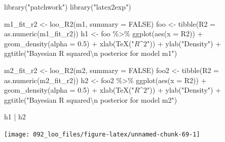\documentclass[
  10pt,
  italian,
  a4paper,
  extrafontsizes,onecolumn,openright
  ]{memoir}
\newenvironment{Shaded}{\begin{snugshade}}{\end{snugshade}}
\newcommand{\AttributeTok}[1]{\textcolor[rgb]{0.77,0.63,0.00}{#1}}
\newcommand{\ConstantTok}[1]{\textcolor[rgb]{0.00,0.00,0.00}{#1}}
\newcommand{\FloatTok}[1]{\textcolor[rgb]{0.00,0.00,0.81}{#1}}
\newcommand{\FunctionTok}[1]{\textcolor[rgb]{0.00,0.00,0.00}{#1}}
\newcommand{\NormalTok}[1]{#1}
\newcommand{\OtherTok}[1]{\textcolor[rgb]{0.56,0.35,0.01}{#1}}
\newcommand{\SpecialCharTok}[1]{\textcolor[rgb]{0.00,0.00,0.00}{#1}}
\newcommand{\StringTok}[1]{\textcolor[rgb]{0.31,0.60,0.02}{#1}}
\theoremstyle{definition}
\theoremstyle{definition}
\theoremstyle{definition}
\theoremstyle{definition}
\theoremstyle{remark}
\begin{document}
\begin{Shaded}
\begin{Highlighting}[]
\FunctionTok{library}\NormalTok{(}\StringTok{"patchwork"}\NormalTok{)}
\FunctionTok{library}\NormalTok{(}\StringTok{"latex2exp"}\NormalTok{)}

\NormalTok{m1\_fit\_r2 }\OtherTok{\textless{}{-}} \FunctionTok{loo\_R2}\NormalTok{(m1, }\AttributeTok{summary =} \ConstantTok{FALSE}\NormalTok{)}
\NormalTok{foo }\OtherTok{\textless{}{-}} \FunctionTok{tibble}\NormalTok{(}\AttributeTok{R2 =} \FunctionTok{as.numeric}\NormalTok{(m1\_fit\_r2))}
\NormalTok{h1 }\OtherTok{\textless{}{-}}\NormalTok{ foo }\SpecialCharTok{\%\textgreater{}\%} 
  \FunctionTok{ggplot}\NormalTok{(}\FunctionTok{aes}\NormalTok{(}\AttributeTok{x =}\NormalTok{ R2)) }\SpecialCharTok{+}
  \FunctionTok{geom\_density}\NormalTok{(}\AttributeTok{alpha =} \FloatTok{0.5}\NormalTok{) }\SpecialCharTok{+}
  \FunctionTok{xlab}\NormalTok{(}\FunctionTok{TeX}\NormalTok{(}\StringTok{"$R\^{}2$"}\NormalTok{)) }\SpecialCharTok{+}
  \FunctionTok{ylab}\NormalTok{(}\StringTok{"Density"}\NormalTok{) }\SpecialCharTok{+}
  \FunctionTok{ggtitle}\NormalTok{(}\StringTok{"Bayesian R squared}\SpecialCharTok{\textbackslash{}n}\StringTok{ posterior for model m1"}\NormalTok{)}

\NormalTok{m2\_fit\_r2 }\OtherTok{\textless{}{-}} \FunctionTok{loo\_R2}\NormalTok{(m2, }\AttributeTok{summary =} \ConstantTok{FALSE}\NormalTok{)}
\NormalTok{foo2 }\OtherTok{\textless{}{-}} \FunctionTok{tibble}\NormalTok{(}\AttributeTok{R2 =} \FunctionTok{as.numeric}\NormalTok{(m2\_fit\_r2))}
\NormalTok{h2 }\OtherTok{\textless{}{-}}\NormalTok{ foo2 }\SpecialCharTok{\%\textgreater{}\%} 
  \FunctionTok{ggplot}\NormalTok{(}\FunctionTok{aes}\NormalTok{(}\AttributeTok{x =}\NormalTok{ R2)) }\SpecialCharTok{+}
  \FunctionTok{geom\_density}\NormalTok{(}\AttributeTok{alpha =} \FloatTok{0.5}\NormalTok{) }\SpecialCharTok{+}
  \FunctionTok{xlab}\NormalTok{(}\FunctionTok{TeX}\NormalTok{(}\StringTok{"$R\^{}2$"}\NormalTok{)) }\SpecialCharTok{+}
  \FunctionTok{ylab}\NormalTok{(}\StringTok{"Density"}\NormalTok{) }\SpecialCharTok{+}
  \FunctionTok{ggtitle}\NormalTok{(}\StringTok{"Bayesian R squared}\SpecialCharTok{\textbackslash{}n}\StringTok{ posterior for model m2"}\NormalTok{)}

\NormalTok{h1 }\SpecialCharTok{|}\NormalTok{ h2}
\end{Highlighting}
\end{Shaded}

\begin{center}\texttt{[image: 092\_loo\_files/figure-latex/unnamed-chunk-69-1]} \end{center}
\end{document}
